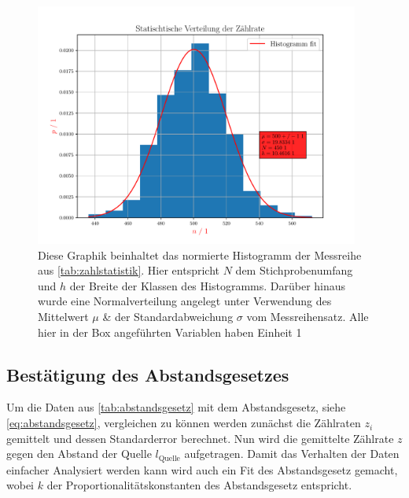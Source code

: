 \documentclass[12pt,english,ngerman]{scrartcl}
\begin{document}
\begin{figure}[H]
	\begin{center}
		\includegraphics[width=0.95\textwidth]{./figures/10statistik.pdf}
	\end{center}
	\caption[Histogramm der Zählstatistik mit Klassen der Größe 10]{
		Diese Graphik
		beinhaltet das normierte Histogramm der Messreihe aus
		\autoref{tab:zahlstatistik}. Hier entspricht $N$ dem Stichprobenumfang und $h$
		der Breite der Klassen des Histogramms. Darüber hinaus wurde eine
		Normalverteilung angelegt unter Verwendung des Mittelwert $\mu$ \& der
		Standardabweichung $\sigma$ vom Messreihensatz. Alle hier in der Box
		angeführten Variablen haben Einheit 1
	}\label{fig:10statistik}
\end{figure}

\subsection{Bestätigung des Abstandsgesetzes}

Um die Daten aus \autoref{tab:abstandsgesetz} mit dem Abstandsgesetz, siehe
\autoref{eq:abstandsgesetz}, vergleichen zu können werden zunächst die
Zählraten $z_i$ gemittelt und dessen Standarderror berechnet. Nun wird die
gemittelte Zählrate $z$ gegen den Abstand der Quelle $l_{\mathrm{Quelle}}$
aufgetragen. Damit das Verhalten der Daten einfacher Analysiert werden kann
wird auch ein Fit des Abstandsgesetz gemacht, wobei $k$ der
Proportionalitätskonstanten des Abstandsgesetz entspricht.
\end{document}
